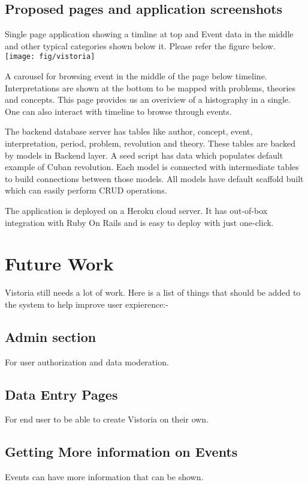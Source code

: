 \section{Proposed pages and application screenshots}
Single page application showing a timline at top and Event data in the middle and other typical categories shown below it. Please refer the figure below.
\\
\texttt{[image: fig/vistoria]}

A carousel for browsing event in the middle of the page below timeline. Interpretations are shown at the bottom to be mapped with problems, theories and concepts. This page provides us an overiview of a histography in a single. One can also interact with timeline to browse through events.

The backend database server has tables like author, concept, event, interpretation, period, problem, revolution and theory. These tables are backed by models in Backend layer. A seed script has data which populates default example of Cuban revolution. Each model is connected with intermediate tables to build connections between those models. All models have default scaffold built which can easily perform CRUD operations.

The application is deployed on a Heroku cloud server. It has out-of-box integration with Ruby On Rails and is easy to deploy with just one-click.

\chapter{Future Work}
Vistoria still needs a lot of work. Here is a list of things that should be added to the system to help improve user expierence:-
\section{Admin section}
For user authorization and data moderation.

\section{Data Entry Pages}
For end user to be able to create Vistoria on their own.

\section{Getting More information on Events}
Events can have more information that can be shown.


